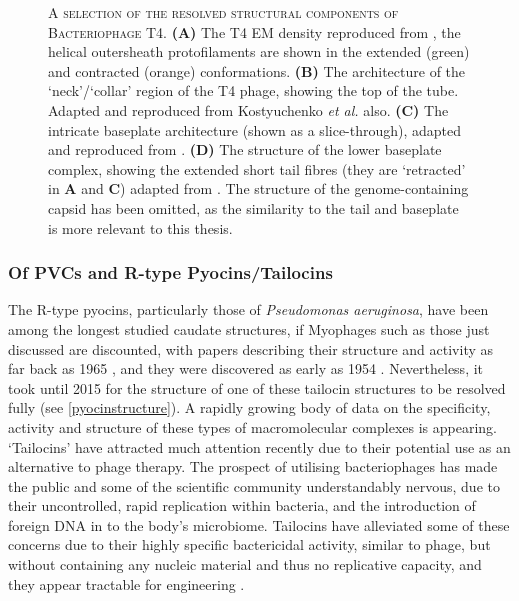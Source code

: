 \begin{figure}[p]
{{\begin{subfigure}[t]{0.45\textwidth}
        \end{subfigure}%
  }\cr
}
	\captionsetup{singlelinecheck=off, justification=justified, font=footnotesize, aboveskip=10pt}
	\caption[Resolved T4 Bacteriophage Structures from literature]{\textsc{\normalsize A selection of the resolved structural components of Bacteriophage T4.}\vspace{0.1cm} \newline \textbf{(A)} The T4 EM density reproduced from \cite{Kostyuchenko2005}, the helical outersheath protofilaments are shown in the extended (green) and contracted (orange) conformations. \textbf{(B)} The architecture of the `neck'/`collar' region of the T4 phage, showing the top of the tube. Adapted and  reproduced from Kostyuchenko \emph{et al.} also. \textbf{(C)} The intricate baseplate architecture (shown as a slice-through), adapted and reproduced from \cite{Kostyuchenko2003}. \textbf{(D)} The structure of the lower baseplate complex, showing the extended short tail fibres (they are `retracted' in \textbf{A} and \textbf{C}) adapted from \cite{Taylor2016}. The structure of the genome-containing capsid has been omitted, as the similarity to the tail and baseplate is more relevant to this thesis.}
	\label{t4structure}
\end{figure}

\clearpage

\subsubsection{Of PVCs and R-type Pyocins/Tailocins}
The R-type pyocins, particularly those of \emph{Pseudomonas aeruginosa}, have been among the longest studied caudate structures, if Myophages such as those just discussed are discounted, with papers describing their structure and activity as far back as 1965 \citep{Ishii1965}, and they were discovered as early as 1954 \citep{jacob1954biosynthese}. Nevertheless, it took until 2015 for the structure of one of these tailocin structures to be resolved fully \citep{Ge2015} (see \vref{pyocinstructure}). A rapidly growing body of data on the specificity, activity and structure of these types of macromolecular complexes is appearing. `Tailocins' have attracted much attention recently due to their potential use as an alternative to phage therapy. The prospect of utilising bacteriophages has made the public and some of the scientific community understandably nervous, due to their uncontrolled, rapid replication within bacteria, and the introduction of foreign DNA in to the body's microbiome. Tailocins have alleviated some of these concerns due to their highly specific bactericidal activity, similar to phage, but without containing any nucleic material and thus no replicative capacity, and they appear tractable for engineering \citep{Scholl2008}.

